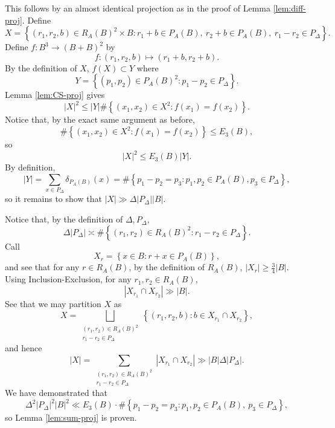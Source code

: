 \documentclass[reqno]{amsart}
\numberwithin{equation}{section}
\begin{document}
This follows by an almost identical projection as in the proof of Lemma \ref{lem:diff-proj}.
Define
\[
    X = \left\{ (r_1,r_2,b)\in R_{A} (B)^{2}\times B : r_1 + b \in P_{A} (B) ,~ r_2 + b \in P_{A} (B),~ r_1 -r_2 \in P_{\Delta}  \right\} 
.\]
Define \(f : B^{3} \to \left( B+ B \right) ^{2}\) by
\[
    f : (r_1,r_2,b) \mapsto (r_1 + b , r_2 + b)
.\]
By the definition of \(X\), \(f(X) \subset Y\) where
\[
    Y = \left\{ (p_1,p_2)\in P_{A} (B)^{2} : p_1 - p_2 \in P_{\Delta}  \right\} 
.\]
Lemma \ref{lem:CS-proj} gives
\[
    \left\lvert X \right\rvert ^{2} \leq \left\lvert Y \right\rvert \# \left\{ (x_1,x_2)\in X^{2} : f(x_1) = f(x_2) \right\} 
.\] 
Notice that, by the exact same argument as before,
\[
    \# \left\{ \left( x_1,x_2 \right) \in X^{2} : f(x_1) = f(x_2) \right\} \leq E_3(B)
,\]
so
\[
    \left\lvert X \right\rvert ^{2}\leq E_3(B) \left\lvert Y \right\rvert 
.\]
By definition,
\[
    \left\lvert Y \right\rvert = \sum _{x \in P_{\Delta} } \delta_{P_{A} (B)} (x)=\# \left\{ p_1 - p_2 = p_3 : p_1,p_2 \in P_{A} (B), p_3 \in P_{\Delta} \right\} 
,\]
so it remains to show that \(\left\lvert X \right\rvert \gg \Delta \left\lvert P_{\Delta}  \right\rvert \left\lvert B \right\rvert \).

Notice that, by the definition of \(\Delta,P_{\Delta} \),
\[
    \Delta \left\lvert P_{\Delta}  \right\rvert \asymp \# \left\{ (r_1,r_2)\in R_{A} (B)^{2} : r_1 - r_2 \in P_{\Delta}  \right\} 
.\]
Call
\[
    X_{r} = \left\{ x \in B : r + x \in P_{A} (B) \right\} 
,\]
and see that for any \(r \in R_{A} (B)\), by the definition of \(R_{A} (B)\), \(\left\lvert X_{r}  \right\rvert \geq \frac{3}{4}  \left\lvert B \right\rvert    \).
Using Inclusion-Exclusion, for any \(r_1,r_2 \in R_{A} (B)\),
\[
    \left\lvert X_{r_1} \cap X_{r_2}  \right\rvert \gg \left\lvert B \right\rvert
.\]
See that we may partition \(X\) as
\[
    X = \bigsqcup _{\substack{ (r_1,r_2) \in R_{A} (B)^{2} \\ r_1 - r_2 \in P_{\Delta}  }} \left\{ (r_1,r_2,b) : b \in X_{r_1} \cap X_{r_2}  \right\} 
,\]
and hence
\[
    \left\lvert X \right\rvert = \sum _{\substack{ (r_1,r_2)\in R_{A} (B)^{2} \\ r_1 - r_2 \in P_{\Delta}  }} \left\lvert X_{r_1} \cap X_{r_2}  \right\rvert \gg \left\lvert B \right\rvert \Delta \left\lvert P_{\Delta}  \right\rvert 
.\]
We have demonstrated that
\[
    \Delta^{2} \left\lvert P_{\Delta}  \right\rvert ^{2} \left\lvert B \right\rvert ^{2} \ll E_3(B) \cdot \# \left\{ p_1 - p_2 = p_3 : p_1,p_2 \in P_{A} (B),~ p_3 \in P_{\Delta}  \right\} 
,\]
so Lemma \ref{lem:sum-proj} is proven.
\end{document}
